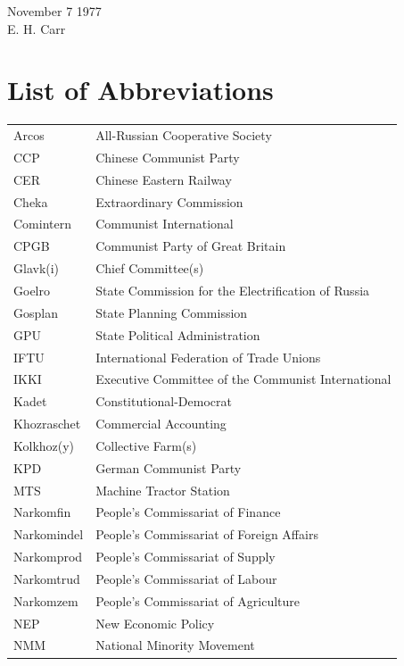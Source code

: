 November 7 1977 %
\\
E. H. Carr 


\chapter*{List of Abbreviations}

\begin{longtable}{@{}p{3.5cm} p{10cm}@{}}
Arcos & All-Russian Cooperative Society \\
CCP & Chinese Communist Party \\
CER & Chinese Eastern Railway \\
Cheka & Extraordinary Commission \\
Comintern & Communist International \\
CPGB & Communist Party of Great Britain \\
Glavk(i) & Chief Committee(s) \\
Goelro & State Commission for the Electrification of Russia \\
Gosplan & State Planning Commission \\
GPU & State Political Administration \\
IFTU & International Federation of Trade Unions \\
IKKI & Executive Committee of the Communist International \\
Kadet & Constitutional-Democrat \\
Khozraschet & Commercial Accounting \\
Kolkhoz(y) & Collective Farm(s) \\
KPD & German Communist Party \\
MTS & Machine Tractor Station \\
Narkomfin & People's Commissariat of Finance \\
Narkomindel & People's Commissariat of Foreign Affairs \\
Narkomprod & People's Commissariat of Supply \\
Narkomtrud & People's Commissariat of Labour \\
Narkomzem & People's Commissariat of Agriculture \\
NEP & New Economic Policy \\
NMM & National Minority Movement \\

\end{longtable}
